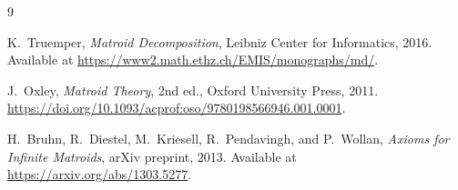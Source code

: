 \begin{thebibliography}{9}

K.~Truemper,
\emph{Matroid Decomposition},
Leibniz Center for Informatics, 2016.
Available at
\url{https://www2.math.ethz.ch/EMIS/monographs/md/}.

J.~Oxley,
\emph{Matroid Theory},
2nd ed., Oxford University Press, 2011.
\url{https://doi.org/10.1093/acprof:oso/9780198566946.001.0001}.

H.~Bruhn, R.~Diestel, M.~Kriesell, R.~Pendavingh, and P.~Wollan,
\emph{Axioms for Infinite Matroids},
arXiv preprint, 2013.
Available at
\url{https://arxiv.org/abs/1303.5277}.

\end{thebibliography}